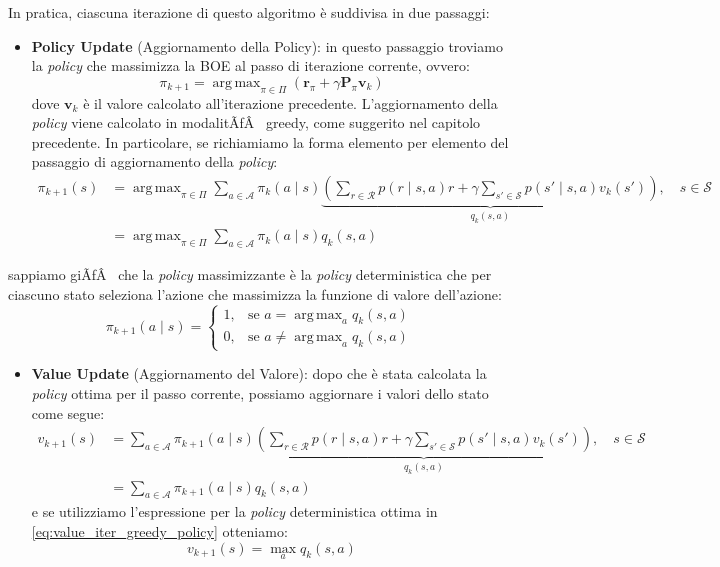 ﻿\documentclass[11pt, a4paper]{report}
\DeclareMathOperator*{\argmax}{arg\,max}
\begin{document}
In pratica, ciascuna iterazione di questo algoritmo è suddivisa in due passaggi:
\begin{itemize}
    \item \textbf{Policy Update} (Aggiornamento della Policy): in questo passaggio troviamo la \emph{policy} che massimizza la BOE al passo di iterazione corrente, ovvero:
    \begin{equation}
    \pi_{k+1} = \argmax_{\pi \in \Pi} (\bm{r}_\pi + \gamma \bm{P}_\pi \bm{v}_k)
    \end{equation}
    dove $\bm{v}_k$ è il valore calcolato all'iterazione precedente. L'aggiornamento della \emph{policy} viene calcolato in modalitÃƒÂ  greedy, come suggerito nel capitolo precedente. In particolare, se richiamiamo la forma elemento per elemento del passaggio di aggiornamento della \emph{policy}:
    \begin{align}
    \pi_{k+1}(s) &= \argmax_{\pi \in \Pi} \sum_{a \in \mathcal{A}} \pi_k(a \mid s) \underbrace{\left( \sum_{r \in \mathcal{R}} p(r \mid s, a)r + \gamma \sum_{s' \in \mathcal{S}} p(s' \mid s, a)v_k(s') \right)}_{q_k(s, a)}, \quad s \in \mathcal{S} \nonumber \\
    &= \argmax_{\pi \in \Pi} \sum_{a \in \mathcal{A}} \pi_k(a \mid s) q_k(s, a)
    \end{align}
\end{itemize}

\newpage

sappiamo giÃƒÂ  che la \emph{policy} massimizzante è la \emph{policy} deterministica che per ciascuno stato seleziona l'azione che massimizza la funzione di valore dell'azione:
\begin{equation}
\pi_{k+1}(a \mid s) = \begin{cases} 1, & \text{se } a = \argmax_a q_k(s, a) \\ 0, & \text{se } a \ne \argmax_a q_k(s, a) \end{cases}
\end{equation}

\begin{itemize}
    \item \textbf{Value Update} (Aggiornamento del Valore): dopo che è stata calcolata la \emph{policy} ottima per il passo corrente, possiamo aggiornare i valori dello stato come segue:
    \begin{align}
    v_{k+1}(s) &= \sum_{a \in \mathcal{A}} \pi_{k+1}(a \mid s) \underbrace{\left( \sum_{r \in \mathcal{R}} p(r \mid s, a)r + \gamma \sum_{s' \in \mathcal{S}} p(s' \mid s, a)v_k(s') \right)}_{q_k(s, a)}, \quad s \in \mathcal{S} \nonumber \\
    &= \sum_{a \in \mathcal{A}} \pi_{k+1}(a \mid s) q_k(s, a)
    \end{align}
    e se utilizziamo l'espressione per la \emph{policy} deterministica ottima in \eqref{eq:value_iter_greedy_policy} otteniamo:
    \begin{equation}
    v_{k+1}(s) = \max_{a} q_k(s, a)
    \end{equation}
\end{itemize}
\end{document}
